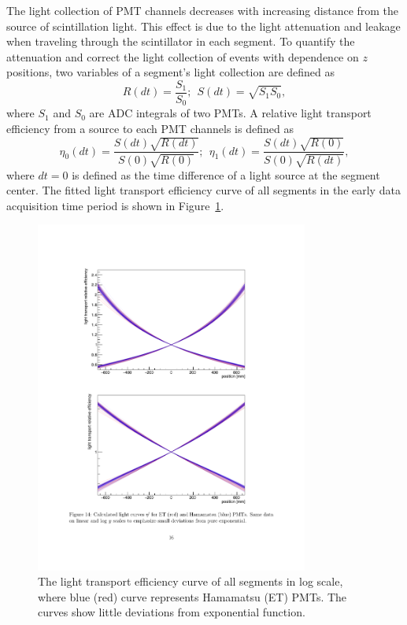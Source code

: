 The light collection of PMT channels decreases with increasing distance from the source of scintillation light.
This effect is due to the light attenuation and leakage when traveling through the scintillator in each segment.
To quantify the attenuation and correct the light collection of events with dependence on $z$ positions, two variables of a segment's light collection are defined as 
\begin{equation}
R(dt) = \frac{S_1}{S_0}; \	\ S(dt) = \sqrt{S_1S_0},
\end{equation}
where $S_1$ and $S_0$ are ADC integrals of two PMTs.
A relative light transport efficiency from a source to each PMT channels is defined as 
\begin{equation}
\eta_0(dt) = \frac{S(dt)\sqrt{R(dt)}}{S(0)\sqrt{R(0)}}; \	\  \eta_1(dt) = \frac{S(dt)\sqrt{R(0)}}{S(0)\sqrt{R(dt)}},
\end{equation}
where $dt = 0$ is defined as the time difference of a light source at the segment center.
The fitted light transport efficiency curve of all segments in the early data acquisition time period is shown in Figure~\ref{fig:EtaFit}.
\begin{figure}[ht]
\centering
\includegraphics[width=0.8\textwidth]{Figures/EtaExpo.pdf}
\caption[The light transport efficiency curve of all segments]{
The light transport efficiency curve of all segments in log scale, where blue (red) curve represents Hamamatsu (ET) PMTs.
The curves show little deviations from exponential function.
}
\label{fig:EtaFit}
\end{figure}

